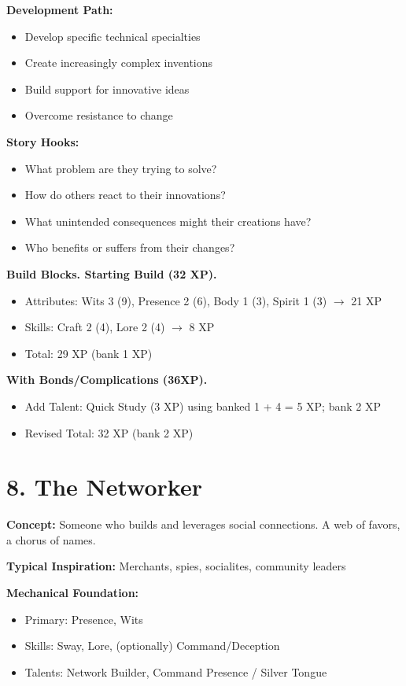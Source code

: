 \documentclass[11pt,twoside,openany]{book}
\begin{document}
\textbf{Development Path:}
\begin{itemize}
\item Develop specific technical specialties
\item Create increasingly complex inventions
\item Build support for innovative ideas
\item Overcome resistance to change
\end{itemize}

\textbf{Story Hooks:}
\begin{itemize}
\item What problem are they trying to solve?
\item How do others react to their innovations?
\item What unintended consequences might their creations have?
\item Who benefits or suffers from their changes?
\end{itemize}

\textbf{Build Blocks. Starting Build (32 XP).}
\begin{itemize}
\item Attributes: Wits 3 (9), Presence 2 (6), Body 1 (3), Spirit 1 (3) $\rightarrow$ 21 XP
\item Skills: Craft 2 (4), Lore 2 (4) $\rightarrow$ 8 XP
\item Total: 29 XP (bank 1 XP)
\end{itemize}

\textbf{With Bonds/Complications (36XP).}
\begin{itemize}
\item Add Talent: Quick Study (3 XP) using banked 1 + 4 = 5 XP; bank 2 XP
\item Revised Total: 32 XP (bank 2 XP)
\end{itemize}

\section*{8. The Networker} 

\textbf{Concept:} Someone who builds and leverages social connections. A web of favors, a chorus of names.

\textbf{Typical Inspiration:} Merchants, spies, socialites, community leaders

\textbf{Mechanical Foundation:}
\begin{itemize}
\item Primary: Presence, Wits
\item Skills: Sway, Lore, (optionally) Command/Deception
\item Talents: Network Builder, Command Presence / Silver Tongue
\end{itemize}
\end{document}

